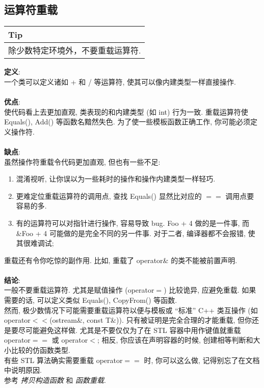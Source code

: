 \documentclass[a4paper,11pt,CJK]{article}
\begin{document}
\begin{CJK}{UTF8}{gbsn}
\subsection{运算符重载}
\begin{table}[htbp]
\flushleft
\begin{tabular}{p{400pt}}
\toprule
\rowcolor[gray]{.8} Tip \\
\midrule
除少数特定环境外，不要重载运算符.\\
\bottomrule
\end{tabular}
\end{table}
\noindent
\textbf{定义}:\\
\indent 一个类可以定义诸如 + 和 / 等运算符, 使其可以像内建类型一样直接操作.\\
\\
\textbf{优点}:\\
\indent 使代码看上去更加直观, 类表现的和内建类型 (如 int) 行为一致. 重载运算符使 Equals(), Add() 等函数名黯然失色. 为了使一些模板函数正确工作, 你可能必须定义操作符.\\
\\
\textbf{缺点}:\\
\indent 虽然操作符重载令代码更加直观, 但也有一些不足:
\begin{enumerate}
\item
混淆视听, 让你误以为一些耗时的操作和操作内建类型一样轻巧.
\item
更难定位重载运算符的调用点, 查找 Equals() 显然比对应的 $==$ 调用点要容易的多.
\item
有的运算符可以对指针进行操作, 容易导致 bug. Foo + 4 做的是一件事, 而 \&Foo + 4 可能做的是完全不同的另一件事. 对于二者, 编译器都不会报错, 使其很难调试;
\end{enumerate}
重载还有令你吃惊的副作用. 比如, 重载了 operator\& 的类不能被前置声明.\\
\\
\textbf{结论}:\\
\indent 一般不要重载运算符. 尤其是赋值操作 (operator$=$) 比较诡异, 应避免重载. 如果需要的话, 可以定义类似 Equals(), CopyFrom() 等函数.\\
\indent 然而, 极少数情况下可能需要重载运算符以便与模板或 ``标准'' C++ 类互操作 (如 operator$<$$<$(ostream\&, const T\&)). 只有被证明是完全合理的才能重载, 但你还是要尽可能避免这样做. 尤其是不要仅仅为了在 STL 容器中用作键值就重载 operator$==$ 或 operator$<$; 相反, 你应该在声明容器的时候, 创建相等判断和大小比较的仿函数类型.\\
\indent 有些 STL 算法确实需要重载 operator$==$ 时, 你可以这么做, 记得别忘了在文档中说明原因.\\
\indent 参考 \emph{拷贝构造函数}  和 \emph{函数重载}.
\\
\\

\end{CJK}
\end{document}
